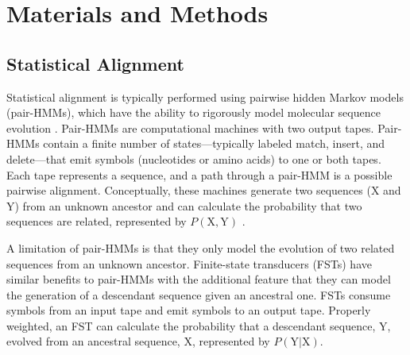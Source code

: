 \section*{Materials and Methods}

\subsection*{Statistical Alignment}

Statistical alignment is typically performed using pairwise hidden Markov models (pair-HMMs), which have the ability to rigorously model molecular sequence evolution .
Pair-HMMs are computational machines with two output tapes. Pair-HMMs contain a finite number of states---typically labeled match, insert, and delete---that emit symbols (nucleotides or amino acids) to one or both tapes.
Each tape represents a sequence, and a path through a pair-HMM is a possible pairwise alignment.
Conceptually, these machines generate two sequences ($\text{X}$ and $\text{Y}$) from an unknown ancestor and can calculate the probability that two sequences are related, represented by $P(\text{X}, \text{Y})$ .

A limitation of pair-HMMs is that they only model the evolution of two related sequences from an unknown ancestor.
Finite-state transducers (FSTs) have similar benefits to pair-HMMs with the additional feature that they can model the generation of a descendant sequence given an ancestral one.
FSTs consume symbols from an input tape and emit symbols to an output tape.
Properly weighted, an FST can calculate the probability that a descendant sequence, $\text{Y}$, evolved from an ancestral sequence, $\text{X}$, represented by $P(\text{Y} | \text{X})$.


